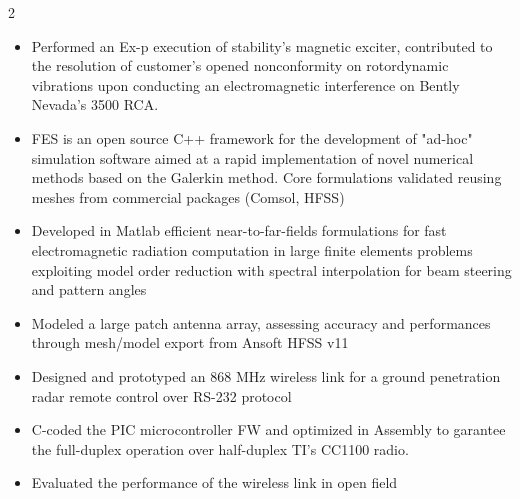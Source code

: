 \documentclass[9.5pt,a4paper,ragged2e,withhyper]{altacv} %
\begin{document}
\begin{paracol}{2}
\begin{itemize}
\item Performed an Ex-p execution of stability’s magnetic exciter, contributed to the
resolution of customer’s opened nonconformity on rotordynamic vibrations upon
conducting an electromagnetic interference on Bently Nevada's 3500 RCA.
\end{itemize}
\divider

\begin{itemize}
\item FES is an open source C++ framework for the development of "ad-hoc" simulation
software aimed at a rapid implementation of novel numerical methods based on the
Galerkin method. Core formulations validated reusing meshes from commercial
packages (Comsol, HFSS)
\end{itemize}
\divider

\begin{itemize}
\item Developed in Matlab efficient near-to-far-fields formulations for fast electromagnetic radiation computation in large finite elements problems exploiting model order
reduction with spectral interpolation for beam steering and pattern angles
\item Modeled a large patch antenna array, assessing accuracy and performances through mesh/model export from Ansoft HFSS v11
\end{itemize}
\divider


\begin{itemize}
    \item Designed and prototyped an 868 MHz wireless link for a ground penetration radar
remote control over RS-232 protocol
\item C-coded the PIC microcontroller FW and
optimized in Assembly to garantee the full-duplex operation over half-duplex TI’s
CC1100 radio. 
\item Evaluated the performance of the wireless link in open field
\end{itemize}



\end{paracol}
\end{document}
